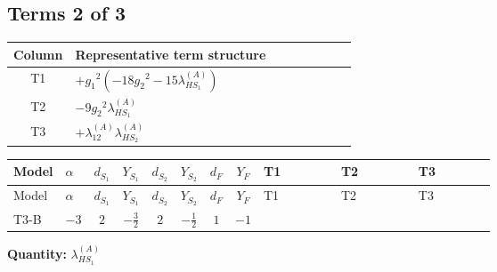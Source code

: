 \documentclass[8pt]{article}
\begin{document}
\begin{landscape}
\subsection*{Terms 2 of 3}
\begin{center}
\begin{tabular}{@{}c >{\raggedright\arraybackslash}p{0.82\linewidth}@{}}
\toprule
Column & Representative term structure \\
\midrule
T1 & \(\displaystyle +{g_1}^2 \left(-18 {g_2}^2-15 {\lambda_{HS_1}^{(A)}}\right)\) \\
\midrule
T2 & \(\displaystyle -9 {g_2}^2 {\lambda_{HS_1}^{(A)}}\) \\
\midrule
T3 & \(\displaystyle +{\lambda_{12}^{(A)}} {\lambda_{HS_2}^{(A)}}\) \\
\midrule
\bottomrule
\end{tabular}
\end{center}
\smallskip
\tiny
\begin{longtable}{@{}llcccccc >{\raggedright\arraybackslash}p{0.21\linewidth} >{\raggedright\arraybackslash}p{0.21\linewidth} >{\raggedright\arraybackslash}p{0.21\linewidth}@{}}
\toprule
Model & $\alpha$ & $d_{S_1}$ & $Y_{S_1}$ & $d_{S_2}$ & $Y_{S_2}$ & $d_F$ & $Y_F$ & T1 & T2 & T3 \\
\midrule
\endfirsthead
\toprule
Model & $\alpha$ & $d_{S_1}$ & $Y_{S_1}$ & $d_{S_2}$ & $Y_{S_2}$ & $d_F$ & $Y_F$ & T1 & T2 & T3 \\
\midrule
\endhead
T3-B & $-3$ & $2$ & $-\frac{3}{2}$ & $2$ & $-\frac{1}{2}$ & $1$ & $-1$ & \scriptsize\adjustbox{max width=\linewidth}{$\begin{gathered} +{g_1}^2 \left(-18 {g_2}^2-15 {\lambda_{HS_1}^{(A)}}\right)\end{gathered}$} & \scriptsize\adjustbox{max width=\linewidth}{$\begin{gathered} -9 {g_2}^2 {\lambda_{HS_1}^{(A)}}\end{gathered}$} & \scriptsize\adjustbox{max width=\linewidth}{$\begin{gathered} +{\lambda_{12}^{(A)}} {\lambda_{HS_2}^{(A)}}\end{gathered}$} \\
\midrule
\bottomrule
\end{longtable}
\clearpage
\noindent\textbf{Quantity: }$\lambda_{HS_1}^{(A)}$\par\smallskip

\end{landscape}
\end{document}
